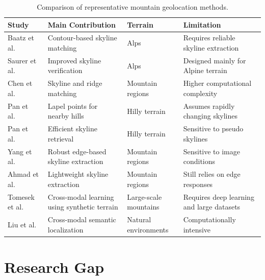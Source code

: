 \begin{table}[H]
\centering
\caption{Comparison of representative mountain geolocation methods.}
\label{tab:literature_comparison}
\small
\begin{tabular}{p{2.8cm}p{2.8cm}p{2.5cm}p{3.4cm}}
\toprule
\textbf{Study} & \textbf{Main Contribution} & \textbf{Terrain} & \textbf{Limitation} \\
\midrule
Baatz et al.~\cite{baatz2012}
&
Contour-based skyline matching
&
Alps
&
Requires reliable skyline extraction
\\

Saurer et al.~\cite{saurer2016image}
&
Improved skyline verification
&
Alps
&
Designed mainly for Alpine terrain
\\

Chen et al.~\cite{chen2015camera}
&
Skyline and ridge matching
&
Mountain regions
&
Higher computational complexity
\\

Pan et al.~\cite{pan2020camera}
&
Lapel points for nearby hills
&
Hilly terrain
&
Assumes rapidly changing skylines
\\

Pan et al.~\cite{pan2021fast}
&
Efficient skyline retrieval
&
Hilly terrain
&
Sensitive to pseudo skylines
\\

Yang et al.~\cite{woo2007robust}
&
Robust edge-based skyline extraction
&
Mountain regions
&
Sensitive to image conditions
\\

Ahmad et al.~\cite{ahmad2021resource}
&
Lightweight skyline extraction
&
Mountain regions
&
Still relies on edge responses
\\

Tomesek et al.~\cite{tomesek2022crosslocate}
&
Cross-modal learning using synthetic terrain
&
Large-scale mountains
&
Requires deep learning and large datasets
\\

Liu et al.~\cite{liu2023cmlocate}
&
Cross-modal semantic localization
&
Natural environments
&
Computationally intensive
\\
\bottomrule
\end{tabular}
\end{table}

\section{Research Gap}

